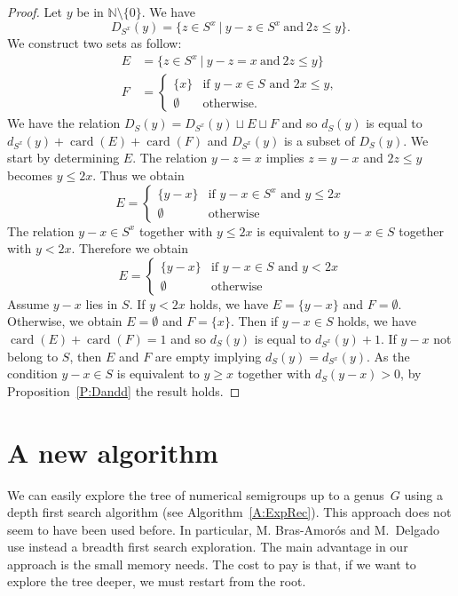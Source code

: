 \documentclass[reqno,11pt]{amsart}
\theoremstyle{plain}
\theoremstyle{definition}
\renewcommand{\leq}{\leqslant}
\renewcommand{\geq}{\geqslant}
\newcommand{\NN}{\mathbb{N}}
\DeclareMathOperator{\card}{card}
\begin{document}
\begin{proof}
Let $y$ be in $\NN\setminus\{0\}$. We have 
\[
D_{S^x}(y)=\{z \in S^x\ |\ y-z\in S^x\ \text{and}\  2z\leq y\}.
\]
We construct two sets as follow:
\begin{align*}
E&=\{z\in S^x\ |\ y-z=x\ \text{and}\ 2z\leq y\}\\
F&=\begin{cases}
\{x\}&\text{if $y-x\in S$ and $2x\leq y$},\\
\emptyset&\text{otherwise}.
\end{cases}
\end{align*}
We have the relation $D_{S}(y)=D_{S^x}(y)\sqcup E\sqcup F$ and so $d_S(y)$ is equal to $d_{S^x}(y)+\card(E)+\card(F)$
and $D_{S^x}(y)$ is a subset of $D_S(y)$. We start by determining $E$. 
The relation $y-z=x$ implies $z=y-x$ and $2z\leq y$ becomes $y\leq 2x$. Thus we obtain
\[
E=\begin{cases}
\{y-x\}&\text{if $y-x\in S^x$ and $y\leq 2x$}\\
\emptyset&\text{otherwise}
\end{cases}
\] 
The relation $y-x\in S^x$ together with $y\leq2x$ is equivalent to $y-x\in S$ together with $y<2x$.
Therefore we obtain
\[
E=\begin{cases}
\{y-x\}&\text{if $y-x\in S$ and $y< 2x$}\\
\emptyset&\text{otherwise}
\end{cases}
\] 
Assume $y-x$ lies in $S$.  If $y<2x$ holds, we have $E=\{y-x\}$ and $F=\emptyset$. Otherwise, we obtain $E=\emptyset$ and $F=\{x\}$. 
Then if $y-x\in S$ holds, we have $\card(E)+\card(F)=1$ and so $d_{S}(y)$ is equal to $d_{S^x}(y)+1$.
If $y-x$ not belong to $S$, then $E$ and $F$ are empty implying $d_{S}(y)=d_{S^x}(y)$. As the condition $y-x\in S$ is equivalent to $y\geq x$ together with $d_S(y-x)>0$, by Proposition~\ref{P:Dandd} the result holds.
\end{proof}

\section{A new algorithm}
\label{S:Algo}
We can easily explore the tree of numerical semigroups up to a genus~$G$ using
a depth first search algorithm (see Algorithm~\ref{A:ExpRec}). This approach does not seem to
have been used before.  In particular, M. Bras-Amor\'os and M.~Delgado use
instead a breadth first search exploration.  The main advantage in our
approach is the small memory needs.  The cost to pay is that, if we want to
explore the tree deeper, we must restart from the root.
\end{document}
